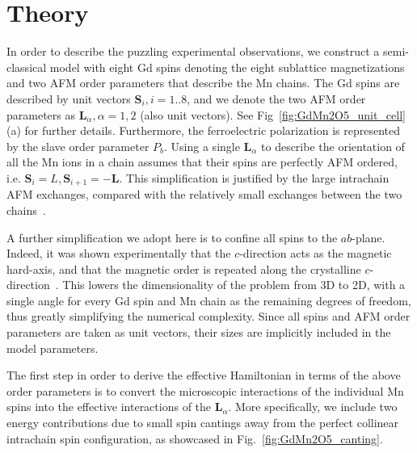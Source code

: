 \section{Theory \label{sec:GdMn2O5_Theory}}
In order to describe the puzzling experimental observations, we construct a semi-classical model with eight Gd spins denoting the eight sublattice magnetizations and two AFM order parameters that describe the Mn chains.
The Gd spins are described by unit vectors $\bm{S}_i, i=1..8$, and we denote the two AFM order parameters as $\bm{L}_\alpha, \alpha=1,2$ (also unit vectors). See Fig~\ref{fig:GdMn2O5_unit_cell}(a) for further details.
Furthermore, the ferroelectric polarization is represented by the slave order parameter $P_b$.
Using a single $\bm{L}_\alpha$ to describe the orientation of all the Mn ions in a chain assumes that their spins are perfectly AFM ordered, i.e. $\bm{S}_i = L, \bm{S}_{i+1} = - \bm{L}$.
This simplification is justified by the large intrachain AFM exchanges, compared with the relatively small exchanges between the two chains~\cite{Souza11}.

A further simplification we adopt here is to confine all spins to the $ab$-plane.
Indeed, it was shown experimentally that the $c$-direction acts as the magnetic hard-axis, and that the magnetic order is repeated along the crystalline $c$-direction~\cite{Lee13}.
This lowers the dimensionality of the problem from 3D to 2D, with a single angle for every Gd spin and Mn chain as the remaining degrees of freedom, thus greatly simplifying the numerical complexity.
Since all spins and AFM order parameters are taken as unit vectors, their sizes are implicitly included in the model parameters.

The first step in order to derive the effective Hamiltonian in terms of the above order parameters is to convert the microscopic interactions of the individual Mn spins into the effective interactions of the $\bm{L}_\alpha$.
More specifically, we include two energy contributions due to small spin cantings away from the perfect collinear intrachain spin configuration, as showcased in Fig.~\ref{fig:GdMn2O5_canting}.

\begin{figure*}[h]
    \centering
	\caption{{\bf Energy contributions due to spin canting.} a) The Zeeman contribution due to the weak ferromagnetic moment along the field (H, red arrow), as a result of the spin canting. b) The contribution due to Heisenberg exchange when previously parallel Mn spins are canted towards a more AFM alignment. This is a direct result of the geometric frustration. The collinear configuration is denoted by the black arrows, with the dashed teal arrows showing the orientation due to the slight canting by the angle $\delta \theta$. \label{fig:GdMn2O5_canting}}
\end{figure*}

